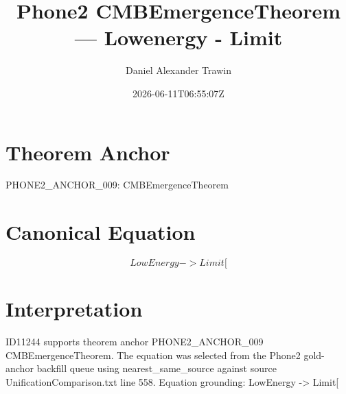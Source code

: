 \documentclass[11pt]{article}
\title{Phone2 CMBEmergenceTheorem — Lowenergy - Limit}
\author{Daniel Alexander Trawin}
\date{2026-06-11T06:55:07Z}
\begin{document}
\maketitle
\section*{Theorem Anchor}
PHONE2_ANCHOR_009: CMBEmergenceTheorem
\section*{Canonical Equation}
\[
LowEnergy -> Limit[
\]
\section*{Interpretation}
ID11244 supports theorem anchor PHONE2_ANCHOR_009 CMBEmergenceTheorem. The equation was selected from the Phone2 gold-anchor backfill queue using nearest_same_source against source UnificationComparison.txt line 558. Equation grounding: LowEnergy -> Limit[
\end{document}
